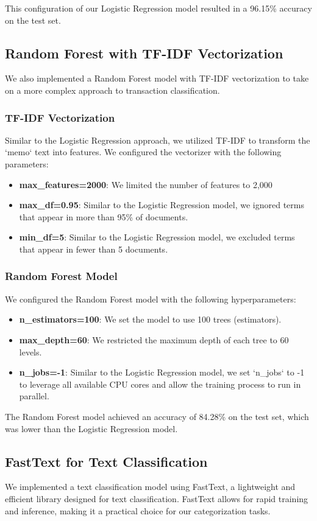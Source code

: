 \documentclass[12pt,letterpaper]{article}
\begin{document}
This configuration of our Logistic Regression model resulted in a 96.15\% accuracy on the test set.

\subsection{Random Forest with TF-IDF Vectorization}
We also implemented a Random Forest model with TF-IDF vectorization to take on a more complex approach to transaction classification.

\subsubsection{TF-IDF Vectorization}
Similar to the Logistic Regression approach, we utilized TF-IDF to transform the `memo` text into features. We configured the vectorizer with the following parameters:
\begin{itemize}
    \item \textbf{max\_features=2000}: We limited the number of features to 2,000
    \item \textbf{max\_df=0.95}: Similar to the Logistic Regression model, we ignored terms that appear in more than 95\% of documents.
    \item \textbf{min\_df=5}: Similar to the Logistic Regression model, we excluded terms that appear in fewer than 5 documents.
\end{itemize}

\subsubsection{Random Forest Model}
We configured the Random Forest model with the following hyperparameters:
\begin{itemize}
    \item \textbf{n\_estimators=100}: We set the model to use 100 trees (estimators).
    \item \textbf{max\_depth=60}: We restricted the maximum depth of each tree to 60 levels.
    \item \textbf{n\_jobs=-1}: Similar to the Logistic Regression model, we set `n\_jobs` to -1 to leverage all available CPU cores and allow the training process to run in parallel.
\end{itemize}

The Random Forest model achieved an accuracy of 84.28\% on the test set, which was lower than the Logistic Regression model.

\subsection{FastText for Text Classification}
We implemented a text classification model using FastText, a lightweight and efficient library designed for text classification. FastText allows for rapid training and inference, making it a practical choice for our categorization tasks.
\end{document}
